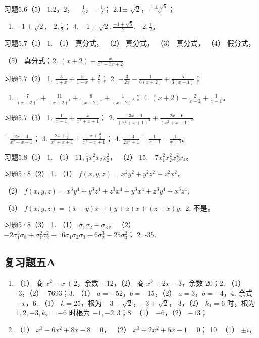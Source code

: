 习题5.6（5） 1.2，2， \(-\frac{1}{2}\)， \(-\frac{1}{2}\)； 2.1±
\(\sqrt{2}\)， \(\frac{1\pm\sqrt{5}}{2}\)；

\begin{enumerate}[start=3]
\item
  \(-1 \pm \sqrt{2}, -2, \frac{1}{2}\)； 4.
  \(-1 \pm \sqrt{2}, \frac{-1 \pm \sqrt{5}}{2}, -2, \frac{1}{2}\)。
\end{enumerate}

习题5.7（1） 1. （1） 真分式， （2） 真分式， （3） 真分式， （4）
假分式，

（5） 真分式；2. \((x+2)-\frac{x}{x^{2}-3x+2}\)

习题5.7（2） 1. \(\frac{3}{1 + x} + \frac{5}{1 - x} + \frac{2}{x}\)； 2.
\(-\frac{3}{2x} - \frac{1}{6(x + 2)} + \frac{5}{3(x - 1)}\)；

\begin{enumerate}[start=3]
\item
  \(\frac{7}{(x - 2)^6} + \frac{11}{(x - 2)^4} + \frac{6}{(x - 2)^3} + \frac{1}{(x - 2)^2}\)；
  4. \((x + 2) - \frac{2}{x - 2} + \frac{1}{x - 1}\)。
\end{enumerate}

习题5.7（3） 1. \(\frac{1}{x - 1} + \frac{x}{x^2 + x + 1}\)； 2.
\(\frac{-3x - 1}{(x^2 + x + 1)^3} + \frac{2x - 6}{(x^2 + x + 1)^2}\)

\(+\frac{2x - 4}{x^2 + x + 1}\)； 3.
\(\frac{2x + \frac{3}{2}}{x^2 + x + 1} + \frac{-x + \frac{3}{2}}{x^2 - x + 1}\)；
4. \(\frac{-4}{2x^2 + 1} + \frac{1}{x - 1} - \frac{1}{x + 1}\)。

习题5.8（1） 1. （1） \(11, \frac{1}{3} x_1^2 x_2 x_2^2\)， （2）
\(15, -7x_1^2 x_2^2 x_3^2 x_4\)。

习题5·8（2） 1. （1） \(f(x, y, z) = x^2 y^2 + y^2 z^2 + z^2 x^2\)，

（2）
\(f(x, y, z) = x^3 y^4 + y^3 z^4 + z^3 x^4 + y^3 x^4 + z^3 y^4 + x^3 z^4,\)

（3） \(f(x, y, z) = (x + y)x + (y + z)x + (z + x)y;\) 2. 不是。

习题5·8（3） 1. （1） \(\sigma_1\sigma_2 - \sigma_3\)， （2）
\(-2\sigma_1^3\sigma_8 + \sigma_1^2\sigma_2^2 + 16\sigma_1\sigma_2\sigma_3 - 6\sigma_2^3 - 25\sigma_3^2\)；
2. -35.

\subsection{复习题五A}

\begin{enumerate}
\item
  （1） 商 \(x^{2} - x + 2\)，余数 \(-12\)，（2） 商
  \(x^{3} + 2x - 3\)，余数 \(20\)；2. （1） -3，（2） -7693；3. （1）
  \(a = -52\)，\(b = -15\)，（2） \(a = 3\)，\(b = -4\)，4. 余式
  \(-x\)，6. （1） \(k = 25\)，根为
  \(-3 - \sqrt{2}\)，\(-3 + \sqrt{2}\)，-3，（2） \(k_{1} = 6\) 时，根为
  \(1, 2, -3, k_{2} = -6\) 时根为 \(-1, -2, 3\)；8. （1） \(-6\)，（2）
  \(-13\)；
\item
  （1） \(x^{3} - 6x^{2} + 8x - 8 = 0\)， （2）
  \(x^{3} + 2x^{2} + 5x - 1 = 0\)； 10. （1） \(\pm i\)，
\end{enumerate}

